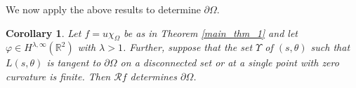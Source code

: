 \documentclass[a4paper,12pt]{amsart}
\numberwithin{equation}{section}
\theoremstyle{plain}
\numberwithin{theorem}{section}
\newtheorem{corollary}[theorem]{Corollary}
\theoremstyle{definition}
\theoremstyle{remark}
\theoremstyle{remark}
\theoremstyle{remark}
\newcommand{\seanc}[1]{\begin{quotation}\textbf{Sean's comment:\
}{\textit{#1}}\end{quotation}}
\begin{document}

We now apply the above results to determine $\partial \Omega$. %

\begin{corollary}
\label{corr_main_2}
Let $f = u\chi_\Omega$ be as in Theorem \ref{main_thm_1} and let $\varphi \in H^{\lambda,\infty}(\mathbb{R}^2)$ with $\lambda > 1$. Further, suppose that the set $\Upsilon$ of $(s,\theta)$ such that $L(s,\theta)$ is tangent to $\partial \Omega$ on a disconnected set or at a single point with zero curvature is finite. %
Then $\mathcal{R}f$ determines $\partial \Omega$.
\end{corollary}
\end{document}
